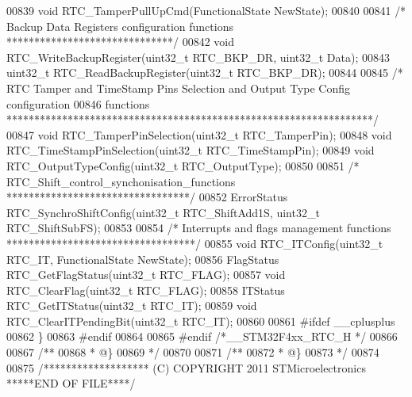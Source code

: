\begin{DoxyCode}
00839 \textcolor{keywordtype}{void} RTC_TamperPullUpCmd(FunctionalState NewState);
00840 
00841 \textcolor{comment}{/* Backup Data Registers configuration functions ******************************/}
00842 \textcolor{keywordtype}{void} RTC_WriteBackupRegister(uint32\_t RTC\_BKP\_DR, uint32\_t Data);
00843 uint32\_t RTC_ReadBackupRegister(uint32\_t RTC\_BKP\_DR);
00844 
00845 \textcolor{comment}{/* RTC Tamper and TimeStamp Pins Selection and Output Type Config configuration}
00846 \textcolor{comment}{   functions ******************************************************************/}
00847 \textcolor{keywordtype}{void} RTC_TamperPinSelection(uint32\_t RTC\_TamperPin);
00848 \textcolor{keywordtype}{void} RTC_TimeStampPinSelection(uint32\_t RTC\_TimeStampPin);
00849 \textcolor{keywordtype}{void} RTC_OutputTypeConfig(uint32\_t RTC\_OutputType);
00850 
00851 \textcolor{comment}{/* RTC\_Shift\_control\_synchonisation\_functions *********************************/}
00852 ErrorStatus RTC_SynchroShiftConfig(uint32\_t RTC\_ShiftAdd1S, uint32\_t RTC\_ShiftSubFS);
00853 
00854 \textcolor{comment}{/* Interrupts and flags management functions **********************************/}
00855 \textcolor{keywordtype}{void} RTC_ITConfig(uint32\_t RTC\_IT, FunctionalState NewState);
00856 FlagStatus RTC_GetFlagStatus(uint32\_t RTC\_FLAG);
00857 \textcolor{keywordtype}{void} RTC_ClearFlag(uint32\_t RTC\_FLAG);
00858 ITStatus RTC_GetITStatus(uint32\_t RTC\_IT);
00859 \textcolor{keywordtype}{void} RTC_ClearITPendingBit(uint32\_t RTC\_IT);
00860 
00861 \textcolor{preprocessor}{#}\textcolor{preprocessor}{ifdef} \_\_cplusplus
00862 \}
00863 \textcolor{preprocessor}{#}\textcolor{preprocessor}{endif}
00864 
00865 \textcolor{preprocessor}{#}\textcolor{preprocessor}{endif} \textcolor{comment}{/*\_\_STM32F4xx\_RTC\_H */}
00866 
00867 \textcolor{comment}{/**}
00868 \textcolor{comment}{  * @\}}
00869 \textcolor{comment}{  */}
00870 
00871 \textcolor{comment}{/**}
00872 \textcolor{comment}{  * @\}}
00873 \textcolor{comment}{  */}
00874 
00875 \textcolor{comment}{/******************* (C) COPYRIGHT 2011 STMicroelectronics *****END OF FILE****/}
\end{DoxyCode}
